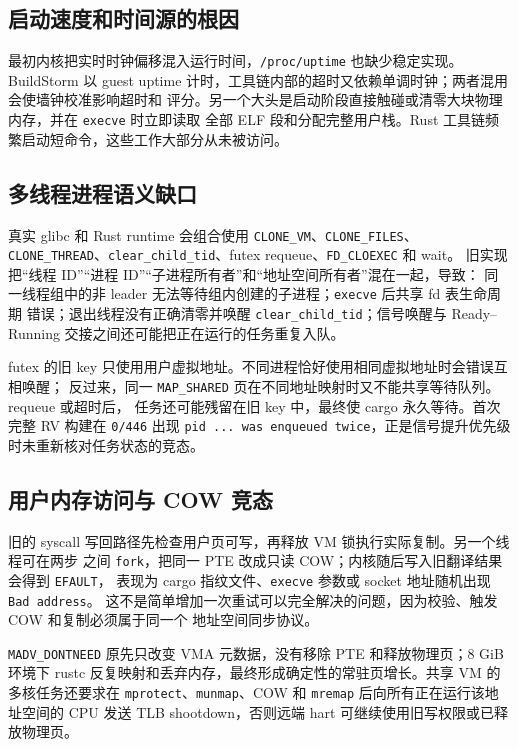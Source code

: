 \documentclass[UTF8,zihao=-4]{ctexart}
\newcommand{\code}{\nolinkurl}
\begin{document}
\subsection{启动速度和时间源的根因}

最初内核把实时时钟偏移混入运行时间，\code{/proc/uptime} 也缺少稳定实现。BuildStorm
以 guest uptime 计时，工具链内部的超时又依赖单调时钟；两者混用会使墙钟校准影响超时和
评分。另一个大头是启动阶段直接触碰或清零大块物理内存，并在 \code{execve} 时立即读取
全部 ELF 段和分配完整用户栈。Rust 工具链频繁启动短命令，这些工作大部分从未被访问。

\subsection{多线程进程语义缺口}

真实 glibc 和 Rust runtime 会组合使用 \code{CLONE_VM}、\code{CLONE_FILES}、
\code{CLONE_THREAD}、\code{clear_child_tid}、futex requeue、\code{FD_CLOEXEC} 和 wait。
旧实现把“线程 ID”“进程 ID”“子进程所有者”和“地址空间所有者”混在一起，导致：
同一线程组中的非 leader 无法等待组内创建的子进程；\code{execve} 后共享 fd 表生命周期
错误；退出线程没有正确清零并唤醒 \code{clear_child_tid}；信号唤醒与 Ready--Running
交接之间还可能把正在运行的任务重复入队。

futex 的旧 key 只使用用户虚拟地址。不同进程恰好使用相同虚拟地址时会错误互相唤醒；
反过来，同一 \code{MAP_SHARED} 页在不同地址映射时又不能共享等待队列。requeue 或超时后，
任务还可能残留在旧 key 中，最终使 cargo 永久等待。首次完整 RV 构建在 \code{0/446}
出现 \code{pid ... was enqueued twice}，正是信号提升优先级时未重新核对任务状态的竞态。

\subsection{用户内存访问与 COW 竞态}

旧的 syscall 写回路径先检查用户页可写，再释放 VM 锁执行实际复制。另一个线程可在两步
之间 \code{fork}，把同一 PTE 改成只读 COW；内核随后写入旧翻译结果会得到 \code{EFAULT}，
表现为 cargo 指纹文件、\code{execve} 参数或 socket 地址随机出现 \code{Bad address}。
这不是简单增加一次重试可以完全解决的问题，因为校验、触发 COW 和复制必须属于同一个
地址空间同步协议。

\code{MADV_DONTNEED} 原先只改变 VMA 元数据，没有移除 PTE 和释放物理页；8 GiB 环境下
rustc 反复映射和丢弃内存，最终形成确定性的常驻页增长。共享 VM 的多核任务还要求在
\code{mprotect}、\code{munmap}、COW 和 \code{mremap} 后向所有正在运行该地址空间的 CPU
发送 TLB shootdown，否则远端 hart 可继续使用旧写权限或已释放物理页。
\end{document}
